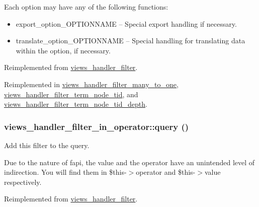 Each option may have any of the following functions:\begin{itemize}
\item export\_\-option\_\-OPTIONNAME -- Special export handling if necessary.\item translate\_\-option\_\-OPTIONNAME -- Special handling for translating data within the option, if necessary. \end{itemize}


Reimplemented from \hyperlink{classviews__handler__filter_053c9173084f1409a92eb390854ec304}{views\_\-handler\_\-filter}.

Reimplemented in \hyperlink{classviews__handler__filter__many__to__one_e72e4f1ca6a64f22737671275d8d7a92}{views\_\-handler\_\-filter\_\-many\_\-to\_\-one}, \hyperlink{classviews__handler__filter__term__node__tid_e81fb582295a2c8871b32bbf8b3ea915}{views\_\-handler\_\-filter\_\-term\_\-node\_\-tid}, and \hyperlink{classviews__handler__filter__term__node__tid__depth_e0822209bc155abaec93555bbeb93e78}{views\_\-handler\_\-filter\_\-term\_\-node\_\-tid\_\-depth}.\hypertarget{classviews__handler__filter__in__operator_f4b9a596ad1e6fbee116977ca0a7d8a9}{
\subsubsection[{query}]{\setlength{\rightskip}{0pt plus 5cm}views\_\-handler\_\-filter\_\-in\_\-operator::query ()}}
\label{classviews__handler__filter__in__operator_f4b9a596ad1e6fbee116977ca0a7d8a9}


Add this filter to the query.

Due to the nature of fapi, the value and the operator have an unintended level of indirection. You will find them in \$this-$>$operator and \$this-$>$value respectively. 

Reimplemented from \hyperlink{classviews__handler__filter_8e513b3abbc2559f37b550ca4957b4ae}{views\_\-handler\_\-filter}.

